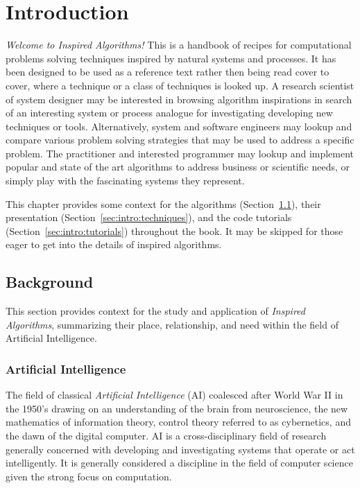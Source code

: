 \chapter{Introduction}
\label{chap:intro}
\emph{Welcome to Inspired Algorithms!} This is a handbook of recipes for computational problems solving techniques inspired by natural systems and processes. It has been designed to be used as a reference text rather then being read cover to cover, where a technique or a class of techniques is looked up. A research scientist of system designer may be interested in browsing algorithm inspirations in search of an interesting system or process analogue for investigating developing new techniques or tools. Alternatively, system and software engineers may lookup and compare various problem solving strategies that may be used to address a specific problem. The practitioner and interested programmer may lookup and implement popular and state of the art algorithms to address business or scientific needs, or simply play with the fascinating systems they represent.

This chapter provides some context for the algorithms (Section~\ref{sec:intro:background}), their presentation (Section~\ref{sec:intro:techniques}), and the code tutorials (Section~\ref{sec:intro:tutorials}) throughout the book. It may be skipped for those eager to get into the details of inspired algorithms. 

\section{Background}
\label{sec:intro:background}
This section provides context for the study and application of \emph{Inspired Algorithms}, summarizing their place, relationship, and need within the field of Artificial Intelligence.

\subsection{Artificial Intelligence}
The field of classical \emph{Artificial Intelligence} (AI) coalesced after World War II in the 1950's drawing on an understanding of the brain from neuroscience, the new mathematics of information theory, control theory referred to as cybernetics, and the dawn of the digital computer. AI is a cross-disciplinary field of research generally concerned with developing and investigating systems that operate or act intelligently. It is generally considered a discipline in the field of computer science given the strong focus on computation.

